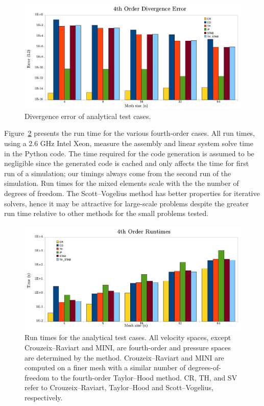 \begin{figure}
  \center\includegraphics[width=\largefig]{chapters/terrel/pdf/div_4.pdf}
  \caption{Divergence error of analytical test cases.}
  \label{fig:terrel:4th_Order:div}
\end{figure}

Figure~\ref{fig:terrel:4th_Order:run} presents the run time for the
various fourth-order cases.  All run times, using a 2.6 GHz Intel Xeon,
measure the assembly and linear system solve time in the Python code. The
time required for the code generation is assumed to be negligible since
the generated code is cached and only affects the time for first run of a
simulation; our timings always come from the second run of the simulation.
Run times for the mixed elements scale with the the number of degrees of
freedom. The Scott--Vogelius method has better properties for iterative
solvers, hence it may be attractive for large-scale problems despite the
greater run time relative to other methods for the small problems tested.

\begin{figure}
  \center \includegraphics[width=\largefig]{chapters/terrel/pdf/run_4.pdf}
  \caption{Run times for the analytical test cases.  All velocity spaces,
    except Crouzeix--Raviart and MINI, are fourth-order and pressure
    spaces are determined by the method. Crouzeix--Raviart and MINI are
    computed on a finer mesh with a similar number of degrees-of-freedom
    to the fourth-order Taylor--Hood method. CR, TH, and SV refer to
    Crouzeix--Raviart, Taylor--Hood and Scott--Vogelius, respectively.}
  \label{fig:terrel:4th_Order:run}
\end{figure}

